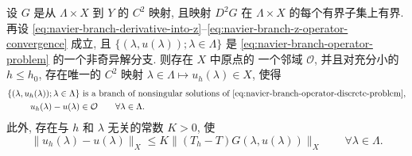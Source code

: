\setcounter{statement}{2}
\begin{Theorem}\label{thm:navier-branch-operator-approximation}
设 $G$ 是从 $\Lambda\times X$ 到 $Y$ 的 $C^2$ 映射, 且映射 $D^2G$
在 $\Lambda\times X$ 的每个有界子集上有界. 再设
\eqref{eq:navier-branch-derivative-into-z}--\eqref{eq:navier-branch-z-operator-convergence}
成立, 且 $\{(\lambda,u(\lambda));\lambda\in\Lambda\}$ 是
\eqref{eq:navier-branch-operator-problem} 的一个非奇异解分支. 则存在 $X$ 中原点的
一个邻域 $\mathcal O$, 并且对充分小的 $h\leq h_0$, 存在唯一的 $C^2$ 映射
$\lambda\in\Lambda\mapsto u_h(\lambda)\in X$, 使得
\begin{align}
\{(\lambda,u_h(\lambda));\lambda\in\Lambda\}
&\text{ is a branch of nonsingular solutions of }
\eqref{eq:navier-branch-operator-discrete-problem},
\label{eq:navier-branch-operator-discrete-branch}\\
u_h(\lambda)-u(\lambda)&\in\mathcal O
\qquad\forall\lambda\in\Lambda.
\label{eq:navier-branch-operator-neighborhood}
\end{align}
此外, 存在与 $h$ 和 $\lambda$ 无关的常数 $K>0$, 使
\begin{equation}\label{eq:navier-branch-operator-error}
\|u_h(\lambda)-u(\lambda)\|_X
\leq K\|(T_h-T)G(\lambda,u(\lambda))\|_X
\qquad\forall\lambda\in\Lambda.
\end{equation}
\end{Theorem}
